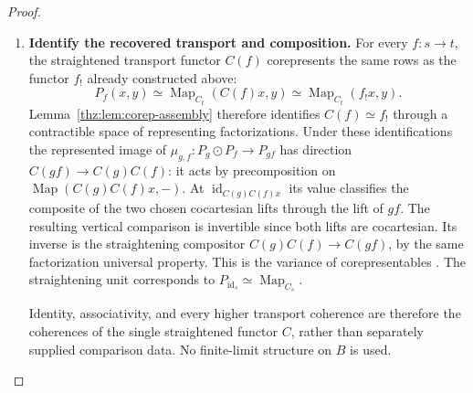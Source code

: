 \documentclass[oneside]{article}
\theoremstyle{plain}
\theoremstyle{definition}
\theoremstyle{remark}
\newcommand{\Cat}{\mathbf{Cat}_{\infty}}
\newcommand{\Map}{\operatorname{Map}}
\newcommand{\id}{\operatorname{id}}
\begin{document}
\begin{proof}
\begin{enumerate}
every source object.  The invariant cocartesian-fibration criterion therefore
applies to $p$, and straightening constructs a coherent functor $C:B\longrightarrow\Cat$ together with an equivalence over $B$ between $p:E\to B$ and its cocartesian
unstraightening.
\item \textbf{Identify the recovered transport and composition.} For every $f:s\to t$, the straightened transport functor $C(f)$ corepresents
the same rows as the functor $f_!$ already constructed above:
\[
 P_f(x,y)\simeq\Map_{C_t}(C(f)x,y)
 \simeq\Map_{C_t}(f_!x,y).
\]
Lemma~\ref{thz:lem:corep-assembly} therefore identifies
$C(f)\simeq f_!$ through a contractible space of representing
factorizations.  Under these identifications the represented image of
$\mu_{g,f}:P_g\odot P_f\to P_{gf}$ has direction
$C(gf)\to C(g)C(f)$: it acts by precomposition on
$\Map(C(g)C(f)x,-)$. At $\id_{C(g)C(f)x}$ its value classifies the
composite of the two chosen cocartesian lifts through the lift of
$gf$. The resulting vertical comparison is invertible since both
lifts are cocartesian. Its inverse is the straightening compositor
$C(g)C(f)\to C(gf)$, by the same factorization universal property.
This is the variance of corepresentables
\cite[Thm.~8.3.3.13]{Kerodon}. The straightening unit corresponds
to $P_{\id_s}\simeq\Map_{C_s}$.

Identity, associativity, and every higher
transport coherence are therefore the coherences of the single straightened
functor $C$, rather than separately supplied comparison data.  No finite-limit
structure on $B$ is used.\qedhere
\end{enumerate}
\end{proof}
\end{document}

